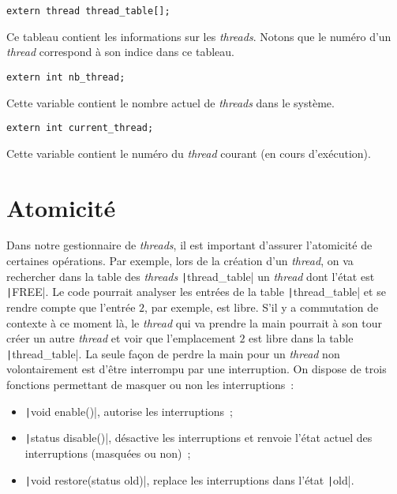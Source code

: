 \documentclass[a4paper]{article}
\begin{document}
\begin{verbatim}
extern thread thread_table[];
\end{verbatim}

Ce tableau contient les informations sur les \emph{threads}. Notons que le numéro d'un \emph{thread} correspond à son indice dans
ce tableau.

\begin{verbatim}
extern int nb_thread;
\end{verbatim}

Cette variable contient le nombre actuel de \emph{threads} dans le système.

\begin{verbatim}
extern int current_thread;
\end{verbatim}

Cette variable contient le numéro du \emph{thread} courant (en cours d'exécution).

\section{Atomicité}

Dans notre gestionnaire de \emph{threads}, il est important d'assurer l'atomicité de certaines opérations. Par exemple,
lors de la création d'un \emph{thread}, on va rechercher dans la table des \emph{threads} \texttt|thread_table| un \emph{thread} dont
l'état est \texttt|FREE|. Le code pourrait analyser les entrées de la table \texttt|thread_table| et se rendre compte que l'entrée $2$, par exemple,
est libre. S'il y a commutation de contexte à ce moment là, le \emph{thread} qui va prendre la main pourrait à son tour créer un autre \emph{thread}
et voir que l'emplacement $2$ est libre dans la table \texttt|thread_table|. La seule façon de perdre la main pour un \emph{thread} non volontairement
est d'être interrompu par une interruption. On dispose de trois fonctions permettant de masquer ou non les interruptions~:\\

\begin{itemize}
\item \texttt|void enable()|, autorise les interruptions~;\\

\item \texttt|status disable()|, désactive les interruptions et renvoie l'état actuel des interruptions (masquées ou non)~;\\

\item \texttt|void restore(status old)|, replace les interruptions dans l'état \texttt|old|.

\end{itemize}
\end{document}
